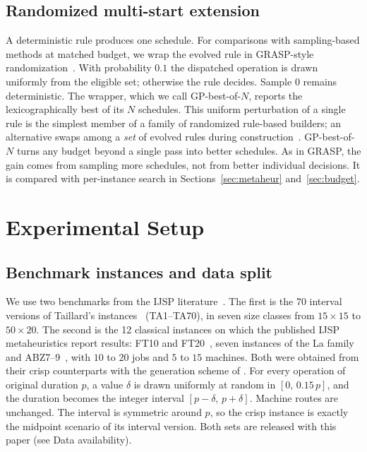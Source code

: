 \documentclass[review,authoryear,11pt]{elsarticle}
\begin{document}
\subsection{Randomized multi-start extension}
\label{sec:grasp}
A deterministic rule produces one schedule. For comparisons with
sampling-based methods at matched budget, we wrap the evolved rule in
GRASP-style randomization~\citep{Feo1995}. With probability $0.1$ the
dispatched operation is drawn uniformly from the eligible set; otherwise
the rule decides. Sample $0$ remains deterministic. The wrapper, which
we call GP-best-of-$N$, reports the lexicographically best of its $N$
schedules. This uniform perturbation of a single rule is the simplest
member of a family of randomized rule-based builders; an alternative
swaps among a \emph{set} of evolved rules during
construction~\citep{GilGala2025GRASB}. GP-best-of-$N$ turns any budget
beyond a single pass into better schedules. As in GRASP, the gain comes
from sampling more schedules, not from better individual decisions. It
is compared with per-instance search in Sections~\ref{sec:metaheur}
and~\ref{sec:budget}.

\section{Experimental Setup}
\label{sec:setup}

\subsection{Benchmark instances and data split}
\label{sec:instances}
We use two benchmarks from the IJSP
literature~\citep{DiazGA2020,DiazFEABC2023,DiazICAE2023}. The first is
the 70 interval versions of Taillard's instances~\citep{Taillard1993}
(TA1--TA70), in seven size classes from $15{\times}15$ to $50{\times}20$.
The second is the 12 classical instances on which the published IJSP
metaheuristics report results: FT10 and FT20~\citep{FisherThompson1963},
seven instances of the La family~\citep{Lawrence1984} and
ABZ7--9~\citep{Adams1988}, with $10$ to $20$ jobs and $5$ to $15$
machines. Both were obtained from their crisp counterparts with the
generation scheme of \citet{DiazGA2020}. For every operation of original
duration $p$, a value $\delta$ is drawn uniformly at random in
$[0,\, 0.15\,p]$, and the duration becomes the integer interval
$[p-\delta,\, p+\delta]$. Machine routes are unchanged. The interval is
symmetric around $p$, so the crisp instance is exactly the midpoint
scenario of its interval version. Both sets are released with this
paper (see Data availability).
\end{document}
